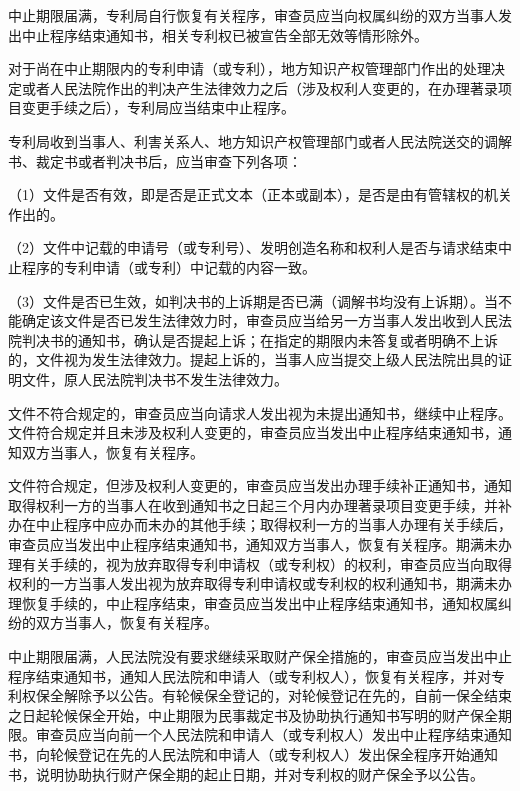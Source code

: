 中止期限届满，专利局自行恢复有关程序，审查员应当向权属纠纷的双方当事人发出中止程序结束通知书，相关专利权已被宣告全部无效等情形除外。

对于尚在中止期限内的专利申请（或专利），地方知识产权管理部门作出的处理决定或者人民法院作出的判决产生法律效力之后（涉及权利人变更的，在办理著录项目变更手续之后），专利局应当结束中止程序。

专利局收到当事人、利害关系人、地方知识产权管理部门或者人民法院送交的调解书、裁定书或者判决书后，应当审查下列各项：

{\setlength{\parindent}{17.1bp}（1）文件是否有效，即是否是正式文本（正本或副本），是否是由有管辖权的机关作出的。\par}

{\setlength{\parindent}{17.1bp}（2）文件中记载的申请号（或专利号）、发明创造名称和权利人是否与请求结束中止程序的专利申请（或专利）中记载的内容一致。\par}

{\setlength{\parindent}{17.1bp}（3）文件是否已生效，如判决书的上诉期是否已满（调解书均没有上诉期）。当不能确定该文件是否已发生法律效力时，审查员应当给另一方当事人发出收到人民法院判决书的通知书，确认是否提起上诉；在指定的期限内未答复或者明确不上诉的，文件视为发生法律效力。提起上诉的，当事人应当提交上级人民法院出具的证明文件，原人民法院判决书不发生法律效力。\par}

文件不符合规定的，审查员应当向请求人发出视为未提出通知书，继续中止程序。文件符合规定并且未涉及权利人变更的，审查员应当发出中止程序结束通知书，通知双方当事人，恢复有关程序。

文件符合规定，但涉及权利人变更的，审查员应当发出办理手续补正通知书，通知取得权利一方的当事人在收到通知书之日起三个月内办理著录项目变更手续，并补办在中止程序中应办而未办的其他手续；取得权利一方的当事人办理有关手续后，审查员应当发出中止程序结束通知书，通知双方当事人，恢复有关程序。期满未办理有关手续的，视为放弃取得专利申请权（或专利权）的权利，审查员应当向取得权利的一方当事人发出视为放弃取得专利申请权或专利权的权利通知书，期满未办理恢复手续的，中止程序结束，审查员应当发出中止程序结束通知书，通知权属纠纷的双方当事人，恢复有关程序。

中止期限届满，人民法院没有要求继续采取财产保全措施的，审查员应当发出中止程序结束通知书，通知人民法院和申请人（或专利权人），恢复有关程序，并对专利权保全解除予以公告。有轮候保全登记的，对轮候登记在先的，自前一保全结束之日起轮候保全开始，中止期限为民事裁定书及协助执行通知书写明的财产保全期限。审查员应当向前一个人民法院和申请人（或专利权人）发出中止程序结束通知书，向轮候登记在先的人民法院和申请人（或专利权人）发出保全程序开始通知书，说明协助执行财产保全期的起止日期，并对专利权的财产保全予以公告。

